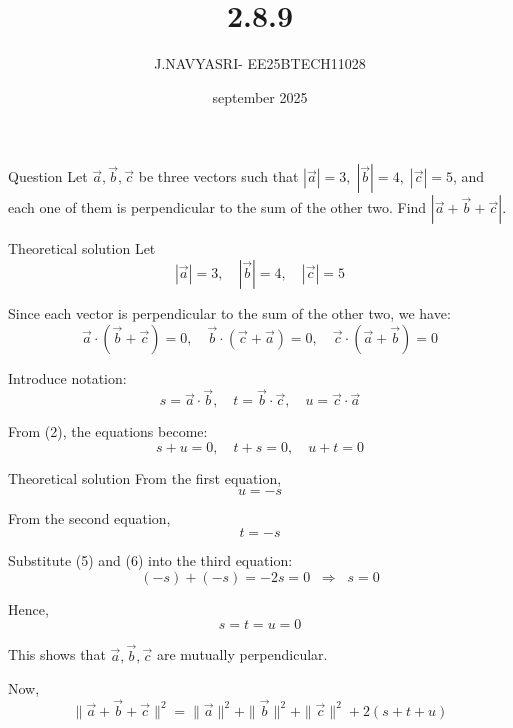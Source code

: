 \documentclass{beamer}
\title %
{2.8.9}
\date{september 2025}
\author %
{J.NAVYASRI- EE25BTECH11028}
\begin{document}
\frame{\titlepage}
\begin{frame}{Question}
Let $\vec{a}, \vec{b}, \vec{c}$ be three vectors such that 
$|\vec{a}|=3,\; |\vec{b}|=4,\; |\vec{c}|=5$, and each one of them is perpendicular to the sum of the other two. 
Find $|\vec{a}+\vec{b}+\vec{c}|$.
\end{frame}

\begin{frame}{Theoretical solution}
Let 
\begin{equation}
|\vec{a}|=3,\quad |\vec{b}|=4,\quad |\vec{c}|=5
\end{equation}

Since each vector is perpendicular to the sum of the other two, we have:
\begin{equation}
\vec{a}\cdot(\vec{b}+\vec{c})=0,\quad 
\vec{b}\cdot(\vec{c}+\vec{a})=0,\quad 
\vec{c}\cdot(\vec{a}+\vec{b})=0
\end{equation}

Introduce notation:
\begin{equation}
s=\vec{a}\cdot\vec{b},\quad t=\vec{b}\cdot\vec{c},\quad u=\vec{c}\cdot\vec{a}
\end{equation}

From (2), the equations become:
\begin{equation}
s+u=0,\quad t+s=0,\quad u+t=0
\end{equation}
\end{frame}

\begin{frame}{Theoretical solution}
From the first equation,
\begin{equation}
u=-s
\end{equation}

From the second equation,
\begin{equation}
t=-s
\end{equation}

Substitute (5) and (6) into the third equation:
\begin{equation}
(-s)+(-s)=-2s=0 \;\;\Rightarrow\;\; s=0
\end{equation}

Hence,
\begin{equation}
s=t=u=0
\end{equation}

This shows that $\vec{a},\vec{b},\vec{c}$ are mutually perpendicular.

Now,
\begin{equation}
\|\vec{a}+\vec{b}+\vec{c}\|^2
= \|\vec{a}\|^2+\|\vec{b}\|^2+\|\vec{c}\|^2 + 2(s+t+u)
\end{equation}
\end{frame}
\end{document}

